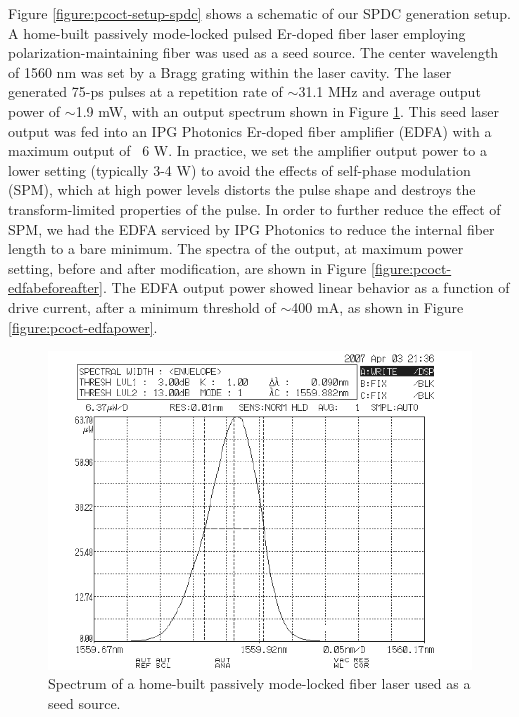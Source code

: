 Figure \ref{figure:pcoct-setup-spdc} shows a schematic of our SPDC generation setup. A home-built passively mode-locked pulsed Er-doped fiber laser employing polarization-maintaining fiber \cite{venkatraman-thesis} was used as a seed source. The center wavelength of 1560 nm was set by a Bragg grating within the laser cavity. The laser generated 75-ps pulses at a repetition rate of $\sim$31.1 MHz and average output power of $\sim$1.9 mW, with an output spectrum shown in Figure \ref{figure:pcoct-seedspectrum}. This seed laser output was fed into an IPG Photonics Er-doped fiber amplifier (EDFA) with a maximum output of ~6 W. In practice, we set the amplifier output power to a lower setting (typically 3-4 W) to avoid the effects of self-phase modulation (SPM), which at high power levels distorts the pulse shape and destroys the transform-limited properties of the pulse. In order to further reduce the effect of SPM, we had the EDFA serviced by IPG Photonics to reduce the internal fiber length to a bare minimum. The spectra of the output, at maximum power setting, before and after modification, are shown in Figure \ref{figure:pcoct-edfabeforeafter}. The EDFA output power showed linear behavior as a function of drive current, after a minimum threshold of $\sim$400 mA, as shown in Figure \ref{figure:pcoct-edfapower}.

\begin{figure}[h]
\begin{center}
\includegraphics[width=13cm]{figure-pcoct-seedspectrum.pdf}
\caption{Spectrum of a home-built passively mode-locked fiber laser \cite{venkatraman-thesis} used as a seed source.}
\label{figure:pcoct-seedspectrum}
\end{center}
\end{figure}


